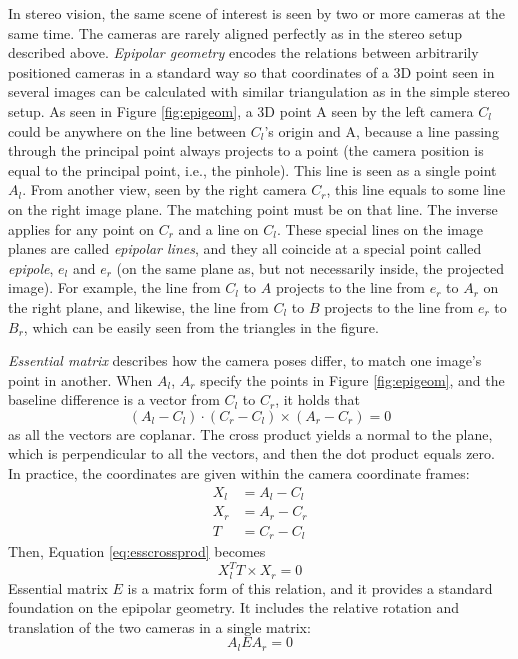 
In stereo vision, the same scene of interest is seen by two or more cameras at the same time.
The cameras are rarely aligned perfectly as in the stereo setup described above.
\emph{Epipolar geometry} \cite[ch. 7.3]{trucco1998introductory} encodes the relations between arbitrarily positioned cameras in a standard way so that coordinates of a 3D point seen in several images can be calculated with similar triangulation as in the simple stereo setup.
\cite{hartley03multiview}
As seen in Figure \ref{fig:epigeom}, a 3D point A seen by the left camera $C_l$ could be anywhere on the line between $C_l$'s origin and A, because a line passing through the principal point always projects to a point (the camera position is equal to the principal point, i.e., the pinhole).
This line is seen as a single point $A_l$.
From another view, seen by the right camera $C_r$, this line equals to some line on the right image plane.
The matching point must be on that line.
The inverse applies for any point on $C_r$ and a line on $C_l$.
These special lines on the image planes are called \emph{epipolar lines}, and they all coincide at a special point called \emph{epipole}, $e_l$ and $e_r$ (on the same plane as, but not necessarily inside, the projected image).
For example, the line from $C_l$ to $A$ projects to the line from $e_r$ to $A_r$ on the right plane, and likewise, the line from $C_l$ to $B$ projects to the line from $e_r$ to $B_r$, which can be easily seen from the triangles in the figure.

\emph{Essential matrix} \cite{hartley03multiview} describes how the camera poses differ, to match one image's point in another.
When $A_l$, $A_r$ specify the points in Figure \ref{fig:epigeom}, and the baseline difference is a vector from $C_l$ to $C_r$, it holds that
\begin{equation} \label{eq:esscrossprod}
	(A_l-C_l) \cdot (C_r - C_l) \times (A_r-C_r) = 0
\end{equation}
as all the vectors are coplanar.
The cross product yields a normal to the plane, which is perpendicular to all the vectors, and then the dot product equals zero.
In practice, the coordinates are given within the camera coordinate frames:
\begin{align*}
	X_l &= A_l - C_l\\
	X_r &= A_r - C_r\\
	T &= C_r - C_l
\end{align*}
Then, Equation \ref{eq:esscrossprod} becomes
\begin{equation}
	X_l^T T \times X_r = 0
\end{equation}
Essential matrix $E$ is a matrix form of this relation, and it provides a standard foundation on the epipolar geometry.
It includes the relative rotation and translation of the two cameras in a single matrix:
\begin{equation} \label{eq:essential}
	A_l E A_r = 0
\end{equation}

